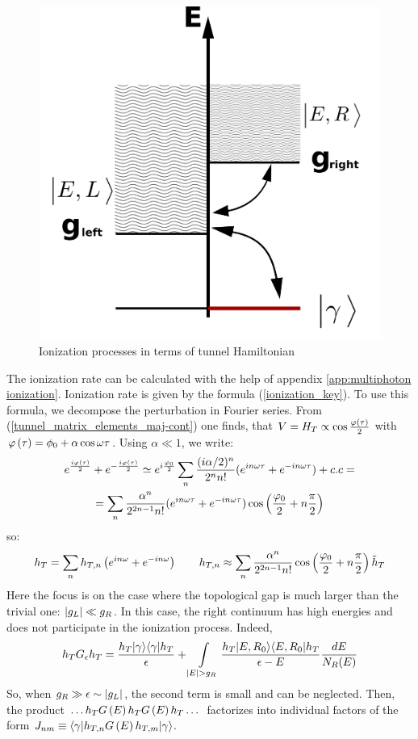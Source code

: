 \begin{figure}[H]
	\centering
	\includegraphics[width=0.65\linewidth]{images/tunneling}
	\caption{Ionization processes in terms of tunnel Hamiltonian}
	\label{fig:tunneling}
\end{figure}

The ionization rate can be calculated with the help of appendix \ref{app:multiphoton ionization}. Ionization rate is given by the formula   (\ref{ionization_key}). To use this formula, we decompose the  perturbation in Fourier series. From  (\ref{tunnel_matrix_elements_maj-cont}) one finds, that $ V=H_T\propto\cos\frac{\varphi\left(\tau\right)}{2} $ with $ \varphi\left(\tau\right)=\phi_{0}+\alpha\cos\omega \tau $. Using $ \alpha\ll1 $, we write:
\begin{multline}
	e^{\frac{i\varphi\left(\tau\right)}{2}}+e^{-\frac{i\varphi\left(\tau\right)}{2}}\simeq e^{i\frac{\varphi_{0}}{2}}\sum_{n}\frac{(i\alpha/2)^{n}}{2^{n}n!}(e^{in\omega \tau}+e^{-in\omega \tau})+c.c=
	\\
	=\sum_{n}\frac{\alpha{}^{n}}{2^{2n-1}n!}(e^{in\omega \tau}+e^{-in\omega \tau})\cos\left(\frac{\varphi_{0}}{2}+n\frac{\pi}{2}\right)
\end{multline}
so:
\begin{gather}
	h_{T}=
	\sum_n
	h_{T,n}
	\left(
	e^{in\omega }
	+
	e^{-in\omega }
	\right)
	\qquad
	h_{T,n}
	\approx
	\sum_{n}	
	\frac
	{\alpha^{n}}
	{2^{2n-1}n!}
	\cos\left(\frac{\varphi_{0}}{2}+n\frac{\pi}{2}\right)
	\tilde{h}_{T}
\end{gather}
Here the focus is on the case where the topological gap is much larger than the trivial one: $ \left|g_L\right|\ll g_R $. In this case, the right continuum has high energies and does not participate in the ionization process. Indeed,
\begin{gather}
	h_T G_{\epsilon} h_T
	=
	\frac{h_T|\gamma\rangle\langle\gamma|h_T}{\epsilon}
	+
	\intop_{|E|>g_{R}}
	\frac{h_T|E,R_0\rangle\langle E,R_0|h_T}{\epsilon-E}\frac{dE}{N_{R}(E)}
\end{gather}
So, when $ g_{R}\gg\epsilon\sim \left|g_L\right| $, the second term is small and can be neglected. Then, the product $ \dots h_TG\left(E\right)h_TG\left(E\right)h_T\dots $ factorizes into individual factors of the form $ J_{nm}\equiv\langle\gamma|h_{T,n}G\left(E\right)h_{T,m}|\gamma\rangle $.

